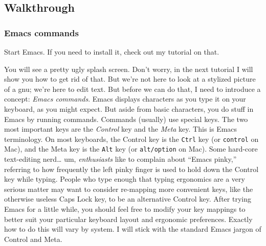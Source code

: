 \documentclass{article}
\begin{document}
\subsection{Walkthrough}
\label{sec-4-2}
\subsubsection{Emacs commands}
\label{sec-4-2-1}

Start Emacs.  If you need to install it, check out my tutorial on that.

You will see a pretty ugly splash screen.  Don't worry, in the next tutorial I will show you how to get rid of that.  But we're not here to look at a stylized picture of a gnu; we're here to edit text.  But before we can do that, I need to introduce a concept: \emph{Emacs commands}.  Emacs displays characters as you type it on your keyboard, as you might expect. But aside from basic characters, you do stuff in Emacs by running commands. Commands (usually) use special keys. The two most important keys are the \emph{Control} key and the \emph{Meta} key.  This is Emacs terminology.  On most keyboards, the Control key is the \texttt{Ctrl} key (or \texttt{control} on Mac), and the Meta key is the \texttt{Alt} key (or \texttt{alt/option} on Mac). Some hard-core text-editing nerd\ldots{} um, \emph{enthusiasts} like to complain about ``Emacs pinky,'' referring to how frequently the left pinky finger is used to hold down the Control key while typing.  People who type enough that typing ergonomics are a very serious matter may want to consider re-mapping more convenient keys, like the otherwise useless Caps Lock key, to be an alternative Control key.  After trying Emacs for a little while, you should feel free to modify your key mappings to better suit your particular keyboard layout and ergonomic preferences.  Exactly how to do this will vary by system.  I will stick with the standard Emacs jargon of Control and Meta.
\end{document}
